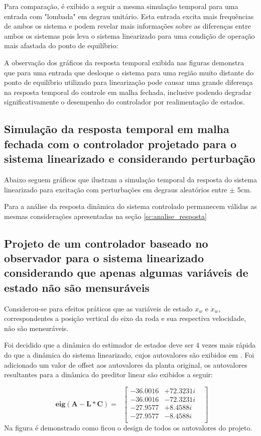 Para comparação, é exibido a seguir a mesma simulação temporal para uma entrada com "lombada" em degrau unitário. Esta entrada excita mais frequências de ambos os sistema e podem revelar mais informações sobre as diferenças entre ambos os sistemas pois leva o sistema linearizado para uma condição de operação mais afastada do ponto de equilíbrio: 
    
A observação dos gráficos da resposta temporal exibida nas figuras demonstra que para uma entrada que desloque o sistema para uma região muito distante do ponto de equilíbrio utilizado para linearização pode causar uma grande diferença na resposta temporal do controle em malha fechada, inclusive podendo degradar significativamente o desempenho do controlador por realimentação de estados.  
        
\subsection{Simulação da resposta temporal em malha fechada com o controlador projetado para o sistema linearizado e considerando perturbação}
 
Abaixo seguem gráficos que ilustram a simulação temporal da resposta do sistema linearizado para excitação com perturbações em degraus aleatórios entre $\pm$ 5cm.

Para a análise da resposta dinâmica do sistema controlado permanecem válidas as mesmas considerações apresentadas na seção \ref{sc:analise_resposta}

\subsection{Projeto de um controlador baseado no observador para o sistema linearizado considerando que apenas algumas variáveis de estado não são mensuráveis}

Considerou-se para efeitos práticos que as variáveis de estado $x_w$ e $\dot{x}_w$, correspondentes a posição vertical do eixo da roda e sua respectiva velocidade, não são mensuráveis.

Foi decidido que a dinâmica do estimador de estados deve ser 4 vezes  mais rápida do que a dinâmica do sistema linearizado, cujos autovalores são exibidos em . Foi adicionado um valor de offset aos autovalores da planta original, os autovalores resultantes para a dinâmica do preditor linear são exibidos a seguir:

    \begin{equation} \label{eq:autovalores_pred}
        \begin{split}
              \mathbf{eig(A-L*C)}=\
        \end{split}
        \begin{bmatrix}
             -36.0016& +72.3231i&\\
             -36.0016& -72.3231i&\\
             -27.9577& +8.4588i&\\
             -27.9577& -8.4588i&\\
        \end{bmatrix}
    \end{equation}
    Na figura  é demonstrado como ficou o design de todos os autovalores do projeto.

